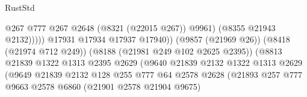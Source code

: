 \begin{lexlean}{RustStd}
\begin{coremodule}
                                                              @267
                                                              @777
                                                              @267
                                                              @2648
                                                              (@8321 (@22015 @267))
                                                              @9961)
                                                            (@8355 @21943 @2132)))))
                                                    @17931
                                                    @17934
                                                    @17937
                                                    @17940))
                                                (@9857 (@21969 @26))
                                                (@8418 (@21974 @712 @249))
                                                (@8188 (@21981 @249 @102 @2625 @2395))
                                                (@8813
                                                  @21839
                                                  @1322
                                                  @1313
                                                  @2395
                                                  @2629
                                                  (@9640
                                                    @21839
                                                    @2132
                                                    @1322
                                                    @1313
                                                    @2629
                                                    (@9649
                                                      @21839
                                                      @2132
                                                      @128
                                                      @255
                                                      @777
                                                      @64
                                                      @2578
                                                      @2628
                                                      (@21893
                                                        @257
                                                        @777
                                                        @9663
                                                        @2578
                                                        @6860
                                                        (@21901 @2578 @21904 @9675)

\end{coremodule}
\end{lexlean}
